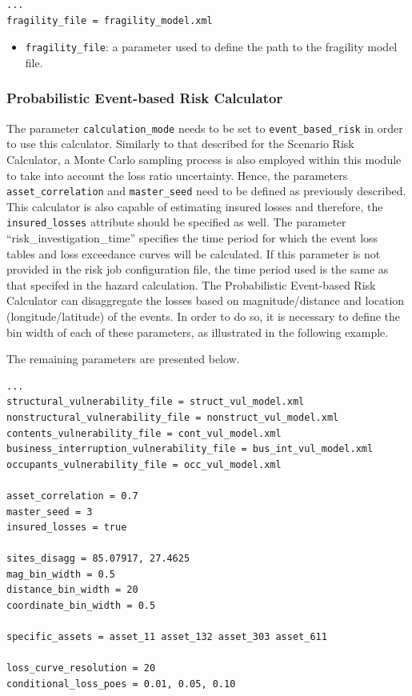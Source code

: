 \begin{Verbatim}[frame=single, commandchars=\\\{\}, samepage=true]
...
fragility_file = fragility_model.xml
\end{Verbatim}

\begin{itemize}
\item  \Verb+fragility_file+: a parameter used to define the path to the \gls{fragility model} file.
\end{itemize}

\subsubsection{Probabilistic Event-based Risk Calculator}
The parameter \Verb+calculation_mode+ needs to be set to \Verb+event_based_risk+ in order to use this calculator. Similarly to that described for the Scenario Risk Calculator, a Monte Carlo sampling process is also employed within this module to take into account the loss ratio uncertainty. Hence, the parameters \Verb+asset_correlation+ and \Verb+master_seed+ need to be defined as previously described. This calculator is also capable of estimating insured losses and therefore, the \Verb+insured_losses+ attribute should be specified as well. The parameter ``risk\_investigation\_time'' specifies the time period for which the event loss tables and loss exceedance curves will be calculated. If this parameter is not provided in the risk job configuration file, the time period used is the same as that specifed in the hazard calculation. The Probabilistic Event-based Risk Calculator can disaggregate the losses based on magnitude/distance and location (longitude/latitude) of the events. In order to do so, it is necessary to define the bin width of each of these parameters, as illustrated in the following example.

The remaining parameters are presented below.

\begin{Verbatim}[frame=single, commandchars=\\\{\}, samepage=true]
...
structural_vulnerability_file = struct_vul_model.xml
nonstructural_vulnerability_file = nonstruct_vul_model.xml
contents_vulnerability_file = cont_vul_model.xml
business_interruption_vulnerability_file = bus_int_vul_model.xml
occupants_vulnerability_file = occ_vul_model.xml

asset_correlation = 0.7
master_seed = 3
insured_losses = true

sites_disagg = 85.07917, 27.4625
mag_bin_width = 0.5
distance_bin_width = 20
coordinate_bin_width = 0.5

specific_assets = asset_11 asset_132 asset_303 asset_611

loss_curve_resolution = 20
conditional_loss_poes = 0.01, 0.05, 0.10
\end{Verbatim}

